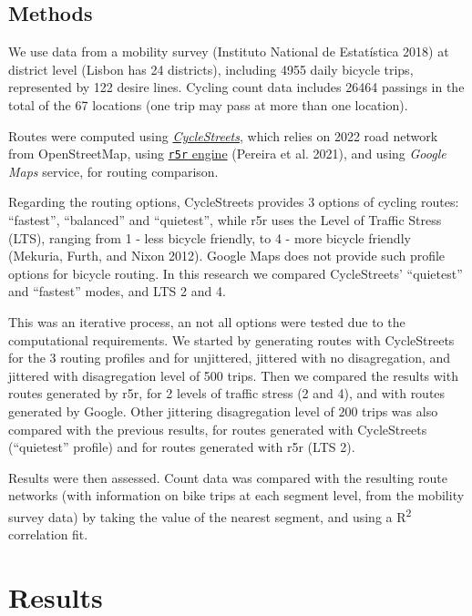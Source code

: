 \documentclass{isprs} %
\begin{document}
\hypertarget{methods}{%
\subsection{Methods}\label{methods}}

We use data from a mobility survey (Instituto National de Estatística 2018) at district level (Lisbon has 24 districts), including 4955 daily bicycle trips, represented by 122 desire lines.
Cycling count data includes 26464 passings in the total of the 67 locations (one trip may pass at more than one location).

Routes were computed using \href{https://cyclestreets.net}{\emph{CycleStreets}}, which relies on 2022 road network from OpenStreetMap, using \href{https://ipeagit.github.io/r5r/}{\texttt{r5r} engine} (Pereira et al. 2021), and using \emph{Google Maps} service, for routing comparison.

Regarding the routing options, CycleStreets provides 3 options of cycling routes: ``fastest'', ``balanced'' and ``quietest'', while r5r uses the Level of Traffic Stress (LTS), ranging from 1 - less bicycle friendly, to 4 - more bicycle friendly (Mekuria, Furth, and Nixon 2012). Google Maps does not provide such profile options for bicycle routing.
In this research we compared CycleStreets' ``quietest'' and ``fastest'' modes, and LTS 2 and 4.

This was an iterative process, an not all options were tested due to the computational requirements. We started by generating routes with CycleStreets for the 3 routing profiles and for unjittered, jittered with no disagregation, and jittered with disagregation level of 500 trips. Then we compared the results with routes generated by r5r, for 2 levels of traffic stress (2 and 4), and with routes generated by Google. Other jittering disagregation level of 200 trips was also compared with the previous results, for routes generated with CycleStreets (``quietest'' profile) and for routes generated with r5r (LTS 2).

Results were then assessed. Count data was compared with the resulting route networks (with information on bike trips at each segment level, from the mobility survey data) by taking the value of the nearest segment, and using a R\textsuperscript{2} correlation fit.

\hypertarget{results}{%
\section{Results}\label{results}}
\end{document}
